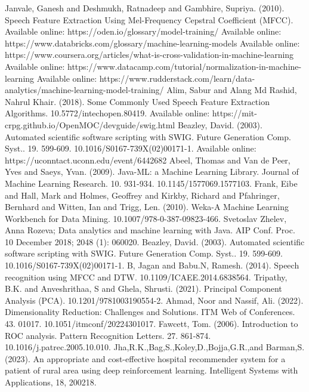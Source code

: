 \documentclass[english,12pt,oneside,a4paper]{article}
\begin{document}
\begin{thebibliography}{15}
		Janvale, Ganesh and Deshmukh, Ratnadeep and Gambhire, Supriya. (2010). Speech Feature Extraction Using Mel-Frequency Cepstral Coefficient (MFCC). 
		Available online:
		https://oden.io/glossary/model-training/
		Available online:
		https://www.databricks.com/glossary/machine-learning-models
		Available online:
		https://www.coursera.org/articles/what-is-cross-validation-in-machine-learning
		Available online:
		https://www.datacamp.com/tutorial/normalization-in-machine-learning
		Available online:
		https://www.rudderstack.com/learn/data-analytics/machine-learning-model-training/
		Alim, Sabur and Alang Md Rashid, Nahrul Khair. (2018). Some Commonly Used Speech Feature Extraction Algorithms. 10.5772/intechopen.80419. 
		Available online:
		https://mit-crpg.github.io/OpenMOC/devguide/swig.html
		Beazley, David. (2003). Automated scientific software scripting with SWIG. Future Generation Comp. Syst.. 19. 599-609. 10.1016/S0167-739X(02)00171-1. 
		Available online:
		https://uconntact.uconn.edu/event/6442682
		Abeel, Thomas and Van de Peer, Yves and Saeys, Yvan. (2009). Java-ML: a Machine Learning Library. Journal of Machine Learning Research. 10. 931-934. 10.1145/1577069.1577103. 
		Frank, Eibe and Hall, Mark and Holmes, Geoffrey and Kirkby, Richard and Pfahringer, Bernhard and Witten, Ian and Trigg, Len. (2010). Weka-A Machine Learning Workbench for Data Mining. 10.1007/978-0-387-09823-466. 
		Svetoslav Zhelev, Anna Rozeva; Data analytics and machine learning with Java. AIP Conf. Proc. 10 December 2018; 2048 (1): 060020.
		Beazley, David. (2003). Automated scientific software scripting with SWIG. Future Generation Comp. Syst.. 19. 599-609. 10.1016/S0167-739X(02)00171-1. 
		B, Jagan and Babu.N, Ramesh. (2014). Speech recognition using MFCC and DTW. 10.1109/ICAEE.2014.6838564.
		Tripathy, B.K. and Anveshrithaa, S and Ghela, Shrusti. (2021). Principal Component Analysis (PCA). 10.1201/9781003190554-2. 
		Ahmad, Noor and Nassif, Ali. (2022). Dimensionality Reduction: Challenges and Solutions. ITM Web of Conferences. 43. 01017. 10.1051/itmconf/20224301017. 
		Fawcett, Tom. (2006). Introduction to ROC analysis. Pattern Recognition Letters. 27. 861-874. 10.1016/j.patrec.2005.10.010. 
		Jha,R.K.,Bag,S.,Koley,D.,Bojja,G.R.,and Barman,S. (2023). An appropriate and cost-effective hospital recommender system for a patient of rural area using deep reinforcement learning. Intelligent Systems with Applications, 18, 200218.

\end{thebibliography}
\end{document}
